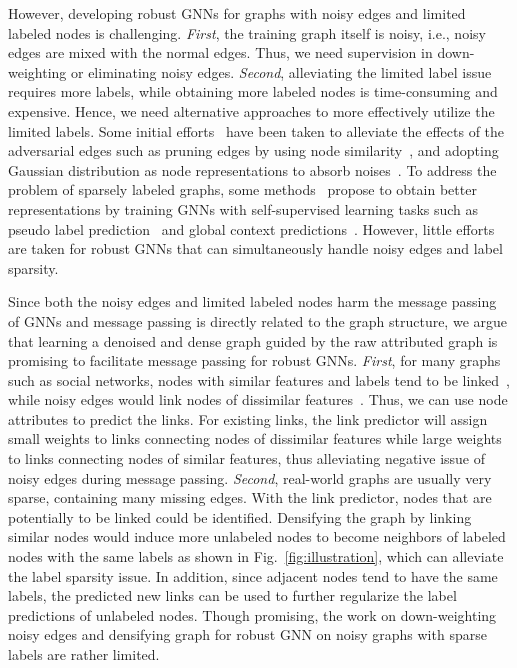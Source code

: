 However, developing robust GNNs for graphs with noisy edges and limited labeled nodes is challenging. \textit{First}, the training graph itself is noisy, i.e., noisy edges are mixed with the normal edges. Thus, we need supervision in down-weighting or eliminating noisy edges. \textit{Second}, alleviating the limited label issue requires more labels, while obtaining more labeled nodes is time-consuming and expensive. Hence, we need alternative approaches to more effectively utilize the limited labels. Some initial efforts~\cite{wu2019adversarial,jin2020graph,tang2020transferring,jin2020graph} have been taken to alleviate the effects of the adversarial edges such as pruning edges by using node similarity~\cite{wu2019adversarial}, and adopting Gaussian distribution as node representations to absorb noises~\cite{zhu2019robust}. To address the problem of sparsely labeled graphs, some methods~\cite{sun2019multi,li2018deeper,peng2020self} propose to obtain better representations by training GNNs with self-supervised learning tasks such as pseudo label prediction~\cite{sun2019multi,li2018deeper} and global context predictions~\cite{peng2020self}. 
However, little efforts are taken for robust GNNs that can simultaneously handle noisy edges and label sparsity.



Since both the noisy edges and limited labeled nodes harm the message passing of GNNs and message passing is directly related to the graph structure, we argue that learning a denoised and dense graph guided by the raw attributed graph is promising to facilitate message passing for robust GNNs. \textit{First}, for many graphs such as social networks, nodes with similar features and labels tend to be linked~\cite{liben2007link}, while noisy edges would link nodes of dissimilar features~\cite{wu2019adversarial}. 
Thus, we can use node attributes to predict the links. For existing links, the link predictor will assign small weights to links connecting nodes of dissimilar features while large weights to links connecting nodes of similar features, thus alleviating negative issue of noisy edges during message passing. \textit{Second}, 
real-world graphs are usually very sparse, containing many missing edges. With the link predictor, nodes that are potentially to be linked could be identified. Densifying the graph by linking similar nodes would induce more unlabeled nodes to become neighbors of labeled nodes with the same labels as shown in Fig.~\ref{fig:illustration}, which can alleviate the label sparsity issue. 
In addition, since adjacent nodes tend to have the same labels, the predicted new links can be used to further regularize the label predictions of unlabeled nodes. Though promising, the work on down-weighting noisy edges and densifying graph for robust GNN on noisy graphs with sparse labels are rather limited. 

